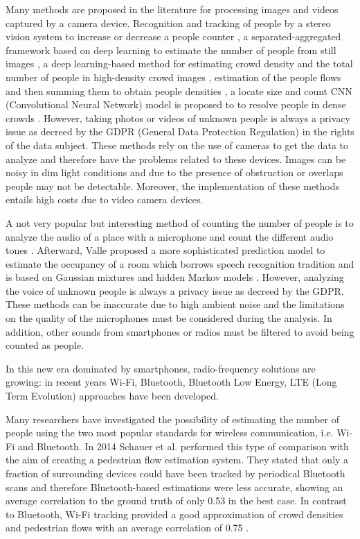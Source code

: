 Many methods are proposed in the literature for processing images and videos captured by a camera device. Recognition and tracking of people by a stereo vision system to increase or decrease a people counter \cite{bernini2014embedded}, a separated-aggregated framework based on deep learning to estimate the number of people from still images \cite{zhang2018auxiliary}, a deep learning-based method for estimating crowd density and the total number of people in high-density crowd images \cite{zhang2019deep}, estimation of the people flows and then summing them to obtain people densities \cite{liu2019estimating}, a locate size and count CNN (Convolutional Neural Network) model is proposed to to resolve people in dense crowds  \cite{sam2019locate}.
However, taking photos or videos of unknown people is always a privacy issue as decreed by the GDPR (General Data Protection Regulation) in the rights of the data subject. These methods rely on the use of cameras to get the data to analyze and therefore have the problems related to these devices. Images can be noisy in dim light conditions and due to the presence of obstruction or overlaps people may not be detectable. Moreover, the implementation of these methods entails high costs due to video camera devices.

A not very popular but interesting method of counting the number of people is to analyze the audio of a place with a microphone and count the different audio tones \cite{kannan2012low}. Afterward, Valle proposed a more sophisticated prediction model to estimate the occupancy of a room which borrows speech recognition tradition and is based on Gaussian mixtures and hidden Markov models \cite{valle2016abroa}.
However, analyzing the voice of unknown people is always a privacy issue as decreed by the GDPR. These methods can be inaccurate due to high ambient noise and the limitations on the quality of the microphones must be considered during the analysis. In addition, other sounds from smartphones or radios must be filtered to avoid being counted as people.

In this new era dominated by smartphones, radio-frequency solutions are growing: in recent years Wi-Fi, Bluetooth, Bluetooth Low Energy, LTE (Long Term Evolution) approaches have been developed.

Many researchers have investigated the possibility of estimating the number of people using the two most popular standards for wireless communication, i.e. Wi-Fi and Bluetooth. In 2014 Schauer et al. performed this type of comparison with the aim of creating a pedestrian flow estimation system. They stated that only a fraction of surrounding devices could have been tracked by periodical Bluetooth scans and therefore Bluetooth-based estimations were less accurate, showing an average correlation to the ground truth of only 0.53 in the best case. In contrast to Bluetooth, Wi-Fi tracking provided a good approximation of crowd densities and pedestrian flows with an average correlation of 0.75 \cite{schauer2014estimating}. 


